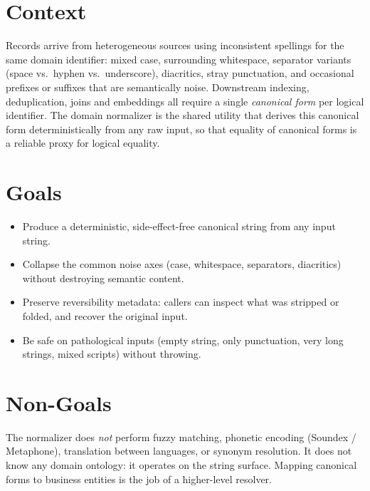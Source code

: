 




\makespecheader

\section{Context}
Records arrive from heterogeneous sources using inconsistent spellings for the same domain identifier: mixed case, surrounding whitespace, separator variants (space vs.\ hyphen vs.\ underscore), diacritics, stray punctuation, and occasional prefixes or suffixes that are semantically noise. Downstream indexing, deduplication, joins and embeddings all require a single \emph{canonical form} per logical identifier. The domain normalizer is the shared utility that derives this canonical form deterministically from any raw input, so that equality of canonical forms is a reliable proxy for logical equality.

\section{Goals}
\begin{itemize}[leftmargin=1.2em]
  \item Produce a deterministic, side-effect-free canonical string from any input string.
  \item Collapse the common noise axes (case, whitespace, separators, diacritics) without destroying semantic content.
  \item Preserve reversibility metadata: callers can inspect what was stripped or folded, and recover the original input.
  \item Be safe on pathological inputs (empty string, only punctuation, very long strings, mixed scripts) without throwing.
\end{itemize}

\section{Non-Goals}
\begin{nongoal}
The normalizer does \emph{not} perform fuzzy matching, phonetic encoding (Soundex / Metaphone), translation between languages, or synonym resolution. It does not know any domain ontology: it operates on the string surface. Mapping canonical forms to business entities is the job of a higher-level resolver.
\end{nongoal}

